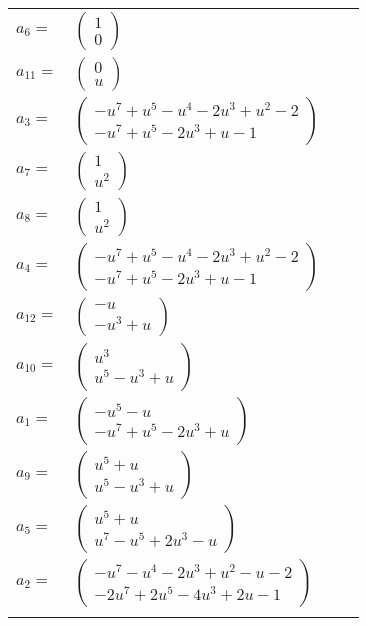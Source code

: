 \documentclass[1p]{elsarticle_modified}
\theoremstyle{definition}
\begin{document}
\begin{tabular}{m{7pt} m{180pt} m{7pt} m{180pt} }
\flushright $a_{6}=$&$\begin{pmatrix}1\\0\end{pmatrix}$ \\
\flushright $a_{11}=$&$\begin{pmatrix}0\\u\end{pmatrix}$ \\
\flushright $a_{3}=$&$\begin{pmatrix}- u^7+u^5- u^4-2 u^3+u^2-2\\- u^7+u^5-2 u^3+u-1\end{pmatrix}$ \\
\flushright $a_{7}=$&$\begin{pmatrix}1\\u^2\end{pmatrix}$ \\
\flushright $a_{8}=$&$\begin{pmatrix}1\\u^2\end{pmatrix}$ \\
\flushright $a_{4}=$&$\begin{pmatrix}- u^7+u^5- u^4-2 u^3+u^2-2\\- u^7+u^5-2 u^3+u-1\end{pmatrix}$ \\
\flushright $a_{12}=$&$\begin{pmatrix}- u\\- u^3+u\end{pmatrix}$ \\
\flushright $a_{10}=$&$\begin{pmatrix}u^3\\u^5- u^3+u\end{pmatrix}$ \\
\flushright $a_{1}=$&$\begin{pmatrix}- u^5- u\\- u^7+u^5-2 u^3+u\end{pmatrix}$ \\
\flushright $a_{9}=$&$\begin{pmatrix}u^5+u\\u^5- u^3+u\end{pmatrix}$ \\
\flushright $a_{5}=$&$\begin{pmatrix}u^5+u\\u^7- u^5+2 u^3- u\end{pmatrix}$ \\
\flushright $a_{2}=$&$\begin{pmatrix}- u^7- u^4-2 u^3+u^2- u-2\\-2 u^7+2 u^5-4 u^3+2 u-1\end{pmatrix}$\\&\end{tabular}
\end{document}
